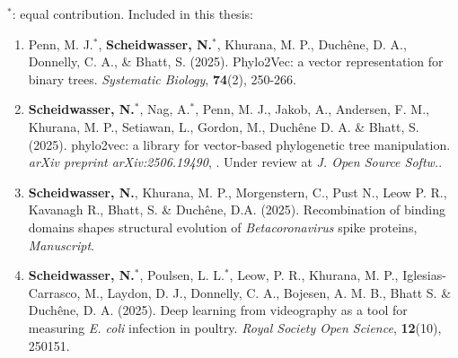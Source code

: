 {\large
$^*$: equal contribution.
\noindent Included in this thesis:
\begin{enumerate}[noitemsep, topsep=0pt, leftmargin=*, align=left]
    \item[Study 1a.] Penn, M. J.$^*$, \textbf{Scheidwasser, N.}$^*$, Khurana, M. P., Duchêne, D. A., Donnelly, C. A., \& Bhatt, S. (2025). Phylo2Vec: a vector representation for binary trees. \textit{Systematic Biology}, \textbf{74}(2), 250-266. 
    \item[Study 1b.] \textbf{Scheidwasser, N.}$^*$, Nag, A.$^*$, Penn, M. J., Jakob, A., Andersen, F. M., Khurana, M. P., Setiawan, L., Gordon, M., Duchêne D. A. \& Bhatt, S. (2025). phylo2vec: a library for vector-based phylogenetic tree manipulation. \textit{arXiv preprint arXiv:2506.19490}, . Under review at \textit{J. Open Source Softw.}. 
    \item[Study 2.] \textbf{Scheidwasser, N.}, Khurana, M. P., Morgenstern, C., Pust N., Leow P. R., Kavanagh R., Bhatt, S. \& Duchêne, D.A. (2025). Recombination of binding domains shapes structural evolution of \textit{Betacoronavirus} spike proteins, \textit{Manuscript}.
    \item[Study 3.] \textbf{Scheidwasser, N.}$^*$, Poulsen, L. L.$^*$, Leow, P. R., Khurana, M. P., Iglesias-Carrasco, M., Laydon, D. J., Donnelly, C. A., Bojesen, A. M. B., Bhatt S. \& Duchêne, D. A. (2025). Deep learning from videography as a tool for measuring \textit{E. coli} infection in poultry. \textit{Royal Society Open Science}, \textbf{12}(10), 250151. 
\end{enumerate}
}

